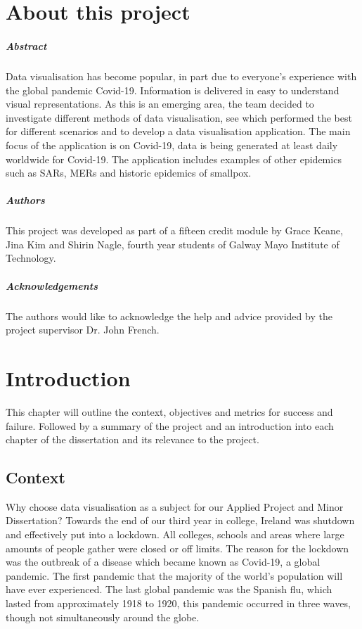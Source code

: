 
\chapter*{About this project}
\paragraph{Abstract}
Data visualisation has become popular, in part due to everyone's experience with the global pandemic Covid-19. Information is delivered in easy to understand visual representations. As this is an emerging area, the team decided to investigate different methods of data visualisation, see which performed the best for different scenarios and to develop a data visualisation application. The main focus of the application is on Covid-19, data is being generated at least daily worldwide for Covid-19. The application includes examples of other epidemics such as SARs, MERs and historic epidemics of smallpox.

\paragraph{Authors}
This project was developed as part of a fifteen credit module by Grace Keane, Jina Kim and Shirin Nagle, fourth year students of Galway Mayo Institute of Technology.

\paragraph{Acknowledgements} The authors would like to acknowledge the help and advice provided by the project supervisor Dr. John French.

\chapter{Introduction}


This chapter will outline the context, objectives and metrics for success and failure. Followed by a summary of the project and an introduction into each chapter of the dissertation and its relevance to the project.

\section{Context}
Why choose data visualisation as a subject for our Applied Project and Minor Dissertation? Towards the end of our third year in college, Ireland was shutdown and effectively put into a lockdown. All colleges, schools and areas where large amounts of people gather were closed or off limits. The reason for the lockdown was the outbreak of a disease which became known as Covid-19, a global pandemic. The first pandemic that the majority of the world's population will have ever experienced. The last global pandemic was the Spanish flu, which lasted from approximately 1918 to 1920, this pandemic occurred in three waves, though not simultaneously around the globe.\cite{Spanishflu}\\

